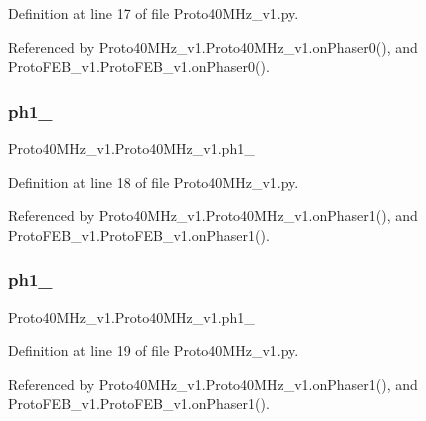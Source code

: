 Definition at line 17 of file Proto40\+M\+Hz\+\_\+v1.\+py.



Referenced by Proto40\+M\+Hz\+\_\+v1.\+Proto40\+M\+Hz\+\_\+v1.\+on\+Phaser0(), and Proto\+F\+E\+B\+\_\+v1.\+Proto\+F\+E\+B\+\_\+v1.\+on\+Phaser0().

\mbox{\label{classProto40MHz__v1_1_1Proto40MHz__v1_af595e54769bd27e92a65a126a7a16e2a}} 
\subsubsection{\texorpdfstring{ph1\+\_}{ph1\_0}}
{\footnotesize\ttfamily Proto40\+M\+Hz\+\_\+v1.\+Proto40\+M\+Hz\+\_\+v1.\+ph1\+\_}



Definition at line 18 of file Proto40\+M\+Hz\+\_\+v1.\+py.



Referenced by Proto40\+M\+Hz\+\_\+v1.\+Proto40\+M\+Hz\+\_\+v1.\+on\+Phaser1(), and Proto\+F\+E\+B\+\_\+v1.\+Proto\+F\+E\+B\+\_\+v1.\+on\+Phaser1().

\mbox{\label{classProto40MHz__v1_1_1Proto40MHz__v1_a573e9e71d8f3e4a9eb413d401bf9810f}} 
\subsubsection{\texorpdfstring{ph1\+\_}{ph1\_1}}
{\footnotesize\ttfamily Proto40\+M\+Hz\+\_\+v1.\+Proto40\+M\+Hz\+\_\+v1.\+ph1\+\_}



Definition at line 19 of file Proto40\+M\+Hz\+\_\+v1.\+py.



Referenced by Proto40\+M\+Hz\+\_\+v1.\+Proto40\+M\+Hz\+\_\+v1.\+on\+Phaser1(), and Proto\+F\+E\+B\+\_\+v1.\+Proto\+F\+E\+B\+\_\+v1.\+on\+Phaser1().

